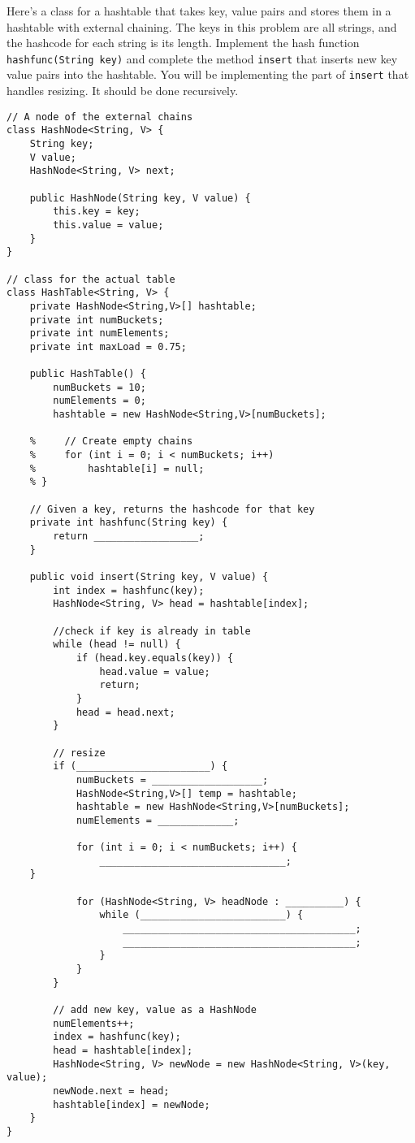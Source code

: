 \question Here’s a class for a hashtable that takes key, value pairs and stores them in a hashtable with external chaining. The keys in this problem are all strings, and the hashcode for each string is its length. Implement the hash function \lstinline{hashfunc(String key)} and complete the method \lstinline{insert} that inserts new key value pairs into the hashtable. You will be implementing the part of \lstinline{insert} that handles resizing. It should be done recursively.

\begin{lstlisting}
// A node of the external chains
class HashNode<String, V> { 
    String key; 
    V value; 
    HashNode<String, V> next; 
  
    public HashNode(String key, V value) { 
        this.key = key; 
        this.value = value; 
    } 
} 

// class for the actual table
class HashTable<String, V> {
    private HashNode<String,V>[] hashtable;
    private int numBuckets;
    private int numElements;
    private int maxLoad = 0.75;

    public HashTable() { 
        numBuckets = 10; 
        numElements = 0;
        hashtable = new HashNode<String,V>[numBuckets]; 
  
    %     // Create empty chains 
    %     for (int i = 0; i < numBuckets; i++) 
    %         hashtable[i] = null; 
    % } 

    // Given a key, returns the hashcode for that key
    private int hashfunc(String key) {
        return __________________;
    }

    public void insert(String key, V value) {
        int index = hashfunc(key);
        HashNode<String, V> head = hashtable[index];

        //check if key is already in table
        while (head != null) {
            if (head.key.equals(key)) { 
                head.value = value; 
                return; 
            } 
            head = head.next;
        }

        // resize
        if (_______________________) {
            numBuckets = ___________________;
            HashNode<String,V>[] temp = hashtable;
            hashtable = new HashNode<String,V>[numBuckets];
            numElements = _____________;

            for (int i = 0; i < numBuckets; i++) {
                ________________________________; 
  	}

            for (HashNode<String, V> headNode : __________) { 
                while (_________________________) {
                    ________________________________________;
                    ________________________________________;
                } 
            }
        }

        // add new key, value as a HashNode
        numElements++;
        index = hashfunc(key);
        head = hashtable[index];
        HashNode<String, V> newNode = new HashNode<String, V>(key, value);
        newNode.next = head;
        hashtable[index] = newNode;
    }
}
\end{lstlisting}

